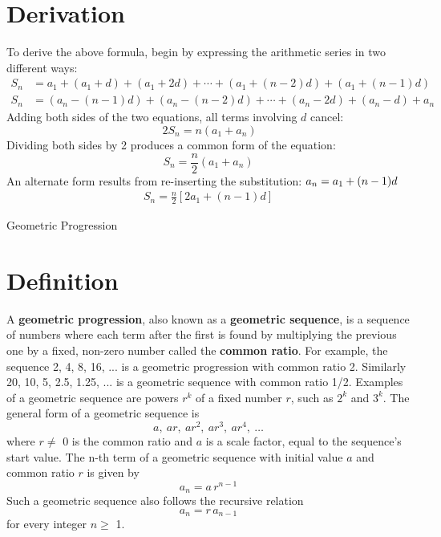 \documentclass{article}
\begin{document}
\section*{Derivation}
To derive the above formula, begin by expressing the arithmetic series in two different ways:
\begin{align*}
 S_n &= a_1 + (a_1+d) + (a_1+2d) + \cdots + (a_1+(n-2)d) + (a_1+(n-1)d)\\
 S_n &=(a_n-(n-1)d)+(a_n-(n-2)d)+\cdots+(a_n-2d)+(a_n-d)+a_n
\end{align*}
Adding both sides of the two equations, all terms involving $d$ cancel:
\begin{equation*}
\ 2S_n=n(a_1 + a_n)
\end{equation*}
Dividing both sides by 2 produces a common form of the equation:
\begin{equation*}
 S_n=\frac{n}{2}( a_1 + a_n)
 \end{equation*}
An alternate form results from re-inserting the substitution: $ a_n = a_1 + (n-1)d\\ $
\begin{gather*}
S_n=\frac{n}{2}[ 2a_1 + (n-1)d]
\end{gather*}

\newpage

\begin{center}
\vspace{100pt}
{\LARGE Geometric Progression}
\end{center}
\section*{Definition}
 A \textbf{geometric progression}, also known as a \textbf{geometric sequence}, is a sequence of numbers where each term after the first is found by multiplying the previous one by a fixed, non-zero number called the \textbf{common ratio}.\newline
For example, the sequence 2, 4, 8, 16, ... is a geometric progression with common ratio 2. Similarly 20, 10, 5, 2.5, 1.25, ... is a geometric sequence with common ratio 1/2.\newline
Examples of a geometric sequence are powers $r^k$ of a fixed number $r$, such as $2^k$ and $3^k$. The general form of a geometric sequence is
\begin{equation*}
a,\ ar,\ ar^2,\ ar^3,\ ar^4,\ \ldots
\end{equation*}
where $r \ne$ 0 is the common ratio and $a$ is a scale factor, equal to the sequence's start value.\newline
The n-th term of a geometric sequence with initial value $a$ and common ratio $r$ is given by
\begin{equation*}
a_n = a\,r^{n-1}
\end{equation*}
Such a geometric sequence also follows the recursive relation
\begin{equation*}
a_n = r\,a_{n-1}
\end{equation*}
 for every integer $n\geq$ 1.
\end{document}
